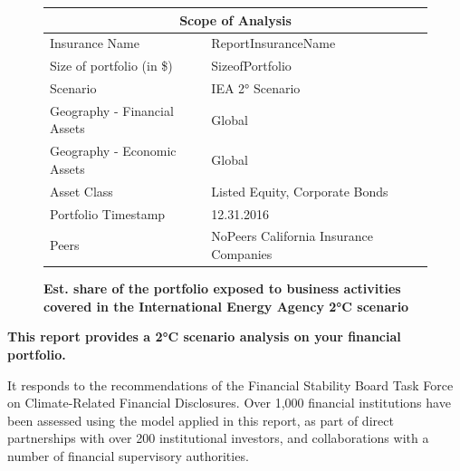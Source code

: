 \documentclass[10pt,twoside,table]{article}\usepackage[]{graphicx}\usepackage[]{color}
\begin{document}
	\setlength\intextsep{0pt}	
	\begin{figure}
		
		
		\begin{center}
			{
				\setlength{\tabcolsep}{10pt} %
				\renewcommand{\arraystretch}{1.5} %
				\begin{tabular}{ p{.35\linewidth} p{.49\linewidth} }
					\hline
					\multicolumn{2}{c}{\textbf{Scope of Analysis}} \\
					\hline
					Insurance Name & ReportInsuranceName  \\ 
					Size of portfolio (in \$) & SizeofPortfolio  \\ 
					Scenario & IEA 2° Scenario  \\ 
					Geography - \newline Financial Assets & Global \\ 
					Geography - \newline Economic Assets & Global  \\ 
					Asset Class & Listed Equity, Corporate Bonds \\ 
					Portfolio Timestamp & 12.31.2016  \\ 
					Peers & NoPeers California Insurance Companies  \\
					\hline
				\end{tabular}
			}
			
		\end{center}

		\vspace{.2cm}
				
		\textbf{Est. share of the portfolio exposed to business activities covered in the International Energy Agency 2°C scenario}
		
		
		\vspace{-5.5cm}
		
	\end{figure}
	\textbf{This report provides a 2°C scenario analysis on your financial portfolio.} 
	
	It responds to the recommendations of the Financial Stability Board Task Force on Climate-Related Financial Disclosures. Over 1,000 financial institutions have been assessed using the model applied in this report, as part of direct partnerships with over 200 institutional investors, and collaborations with  a number of financial supervisory authorities. 
	
\end{document}
